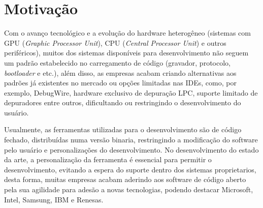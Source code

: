 \section{Motivação}

Com o avanço tecnológico e a evolução do hardware heterogêneo (sistemas com GPU (\textit{Graphic Processor Unit}), CPU (\textit{Central Processor Unit}) e outros periféricos), muitos dos sistemas disponíveis para desenvolvimento não seguem um padrão estabelecido no carregamento de código (gravador, protocolo, \textit{bootloader} e etc.), além disso, as empresas acabam criando alternativas aos padrões já
 existentes no mercado ou opções limitadas nas IDEs, como, por exemplo, DebugWire\cite{debugwire}, hardware exclusivo de depuração LPC\cite{nxp}, suporte limitado de depuradores\cite{kiledebug} entre outros, dificultando ou restringindo o desenvolvimento do usuário.

Usualmente, as ferramentas utilizadas para o desenvolvimento são de código fechado, distribuídas numa versão binaria, restringindo a modificação do software pelo usuário e personalizações do desenvolvimento. No desenvolvimento do estado da arte, a personalização da ferramenta é essencial para permitir o desenvolvimento, evitando a espera do suporte dentro dos sistemas proprietarios, desta forma, muitas empresas acabam aderindo aos software de código aberto pela sua agilidade para adesão a novas tecnologias, podendo destacar Microsoft\cite{microsoftn1}, Intel, Samsung, IBM e Renesas\cite{topskernel}.


\iffalse
\subsubsection{Ferramentas proprietárias}

Pela falta de um padrão definido, muitas empresas resolveram criar seus próprios, fundamentados em seus interesses ou na suas definições de utilização do que deveria ou não conter em suas soluções. Como consequência disso, são criados visões limitadas da realidade, resultante do modo de atuação interno vivida pela empresa, pela sua falta de conhecimento da realidade atual do mercado e suas utilizações.

Como consequência disso, a gama de padrões de protocolos de comunicação, \textit{bootloaders}, ICSPs, compiladores e outros materiais utilizados no desenvolvimento de sistemas embarcados, dificulta a realização do trabalho do desenvolvedor, principalmente se tais periféricos utilizados tem documentação e código fonte fechados, não permitindo seu conhecimento de funcionamento.
\fi

